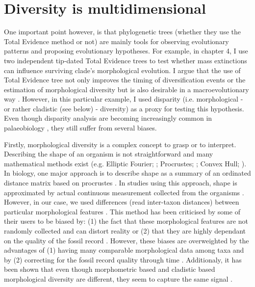 \section{Diversity is multidimensional}
One important point however, is that phylogenetic trees (whether they use the Total Evidence method or not) are mainly tools for observing evolutionary patterns and proposing evolutionary hypotheses.
For example, in chapter 4, I use two independent tip-dated Total Evidence trees to test whether mass extinctions can influence surviving clade's morphological evolution.
I argue that the use of Total Evidence tree not only improves the timing of diversification events \citep[][; which is a crucial aspect when studying effect of mass extinctions which are finites points in time]{ronquista2012} or the estimation of morphological diversity \citep[increasing accuracy in reconstructing node's ancestral characters;][]{Finarelli2006} but is also desirable in a macroevolutionary way \citep{fritzdiversity2013,benton2015}.
However, in this particular example, I used disparity (i.e. morphological - or rather cladistic (see below) - diversity) as a proxy for testing this hypothesis.
Even though disparity analysis are becoming increasingly common in palaeobiology \citep[e.g.]{Butler2012,brusattedinosaur2012,toljagictriassic-jurassic2013,brusattegradual2014,bensonfaunal2014,Claddis,Close2015}, they still suffer from several biases.

Firstly, morphological diversity is a complex concept to grasp or to interpret.
Describing the shape of an organism is not straightforward and many mathematical methods exist (e.g. Elliptic Fourier; \citealt{Fourier1982}; Procrustes; \citealt{JamesRohlf1993129}; Convex Hull; \citealt{ANDREW1979216}).
In biology, one major approach is to describe shape as a summary of an ordinated distance matrix based on procrustes \citep[i.e. a geometric morphometric approach][]{zelditch2012geometric}.
In studies using this approach, shape is approximated by actual continuous measurement collected from the organisms \citep[e.g.]{friedmanexplosive2010,hopkinsdecoupling2013,finlay2015morphological}.
However, in our case, we used differences (read inter-taxon distances) between particular morphological features \citep[e.g.][]{foote1997evolution,Wills2001,Wesley-Hunt2005}.
This method has been criticised by some of their users to be biased by: (1) the fact that these morphological features are not randomly collected and can distort reality \citep{Brusatte12092008}%
 or (2) that they are highly dependant on the quality of the fossil record \citep{Butler2012}.
However, these biases are overweighted by the advantages of (1) having many comparable morphological data among taxa \citep{Brusatte12092008} and by (2) correcting for the fossil record quality through time \citep{Butler2012}.
Additionaly, it has been shown that even though morphometric based and cladistic based morphological diversity are different, they seem to capture the same signal \citep{foth2012different,hetherington2015cladistic}.

